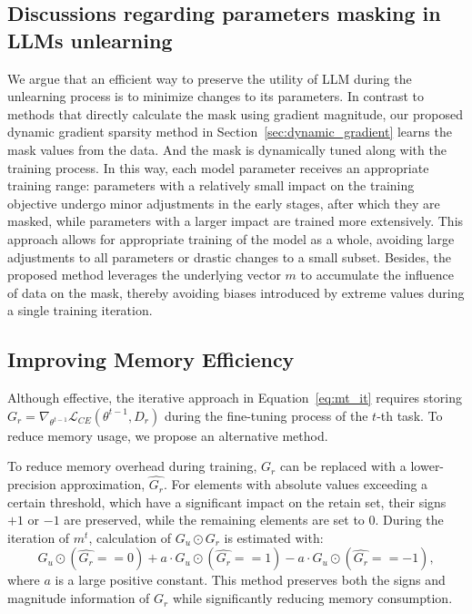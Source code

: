 \documentclass{article}
\theoremstyle{plain}
\theoremstyle{definition}
\theoremstyle{remark}
\begin{document}
\subsection{Discussions regarding parameters masking in LLMs unlearning}
We argue that an efficient way to preserve the utility of LLM during the unlearning process is to minimize changes to its parameters.
In contrast to methods that directly calculate the mask using gradient magnitude, our proposed dynamic gradient sparsity method in Section~\ref{sec:dynamic_gradient} learns the mask values from the data.
And the mask is dynamically tuned along with the training process.
In this way, each model parameter receives an appropriate training range: parameters with a relatively small impact on the training objective undergo minor adjustments in the early stages, after which they are masked, while parameters with a larger impact are trained more extensively. This approach allows for appropriate training of the model as a whole, avoiding large adjustments to all parameters or drastic changes to a small subset.
Besides, the proposed method leverages the underlying vector $m$ to accumulate the influence of data on the mask, thereby avoiding biases introduced by extreme values during a single training iteration.

\subsection{Improving Memory Efficiency}
\label{sec:memory_efficiency}	
Although effective, the iterative approach in Equation~\ref{eq:mt_it} requires storing $G_r=\nabla_{\theta^{t-1}}\mathcal{L}_{CE}(\theta^{t-1}, D_r)$ during the fine-tuning process of the $t$-th task. To reduce memory usage, we propose an alternative method.%

To reduce memory overhead during training, $G_r$ can be replaced with a lower-precision approximation, $\hat{G_r}$. For elements with absolute values exceeding a certain threshold, which have a significant impact on the retain set, their signs $+1$ or $-1$ are preserved, while the remaining elements are set to $0$.
During the iteration of $m^t$, calculation of $G_u\odot G_r$ is estimated with:
\begin{equation}
    G_u\odot(\hat{G_r}==0)+a\cdot G_u\odot(\hat{G_r}==1)-a\cdot G_u\odot(\hat{G_r}==-1),
\end{equation}
where $a$ is a large positive constant.
This method preserves both the signs and magnitude information of $G_r$ while significantly reducing memory consumption.
\end{document}
